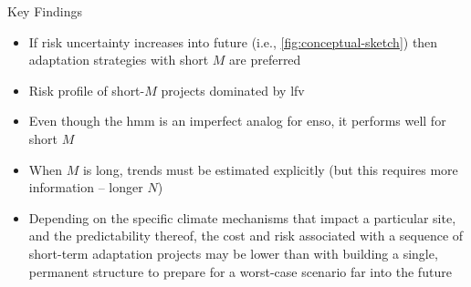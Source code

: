 \begin{block}{Key Findings}
    \begin{itemize}
        \item If risk uncertainty increases into future (i.e., \cref{fig:conceptual-sketch}) then adaptation strategies with short $M$ are preferred \cite{Haasnoot:2013im, Zeff:2016hx}
        \item Risk profile of short-$M$ projects dominated by \acrlong{lfv} \cite{Jain:2001hz, Hodgkins:2017hw}
        \item Even though the \gls{hmm} is an imperfect analog for \gls{enso}, it performs well for short $M$
        \item When $M$ is long, trends must be estimated explicitly (but this requires more information -- longer $N$)
        \item Depending on the specific climate mechanisms that impact a particular site, and the predictability thereof, the cost and risk associated with a sequence of short-term adaptation projects may be lower than with building a single, permanent structure to prepare for a worst-case scenario far into the future
    \end{itemize}
\end{block}
